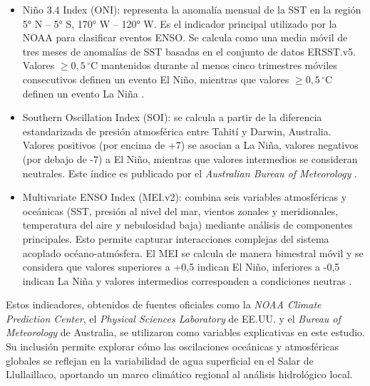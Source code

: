 \begin{itemize}
    \item Niño 3.4 Index (ONI): representa la anomalía mensual de la SST en la región 5° N – 5° S, 170° W – 120° W. Es el indicador principal utilizado por la NOAA para clasificar eventos ENSO. Se calcula como una media móvil de tres meses de anomalías de SST basadas en el conjunto de datos ERSST.v5. Valores $\geq 0{,}5\,^{\circ}\text{C}$ mantenidos durante al menos cinco trimestres móviles consecutivos definen un evento El Niño, mientras que valores $\geq 0{,}5\,^{\circ}\text{C}$ definen un evento La Niña \parencite{noaaONI}.
    
    \item Southern Oscillation Index (SOI): se calcula a partir de la diferencia estandarizada de presión atmosférica entre Tahití y Darwin, Australia. Valores positivos (por encima de +7) se asocian a La Niña, valores negativos (por debajo de -7) a El Niño, mientras que valores intermedios se consideran neutrales. Este índice es publicado por el \textit{Australian Bureau of Meteorology} \parencite{bom_soi_2024}.
    
    \item Multivariate ENSO Index (MEI.v2): combina seis variables atmosféricas y oceánicas (SST, presión al nivel del mar, vientos zonales y meridionales, temperatura del aire y nebulosidad baja) mediante análisis de componentes principales. Esto permite capturar interacciones complejas del sistema acoplado océano-atmósfera. El MEI se calcula de manera bimestral móvil y se considera que valores superiores a +0,5 indican El Niño, inferiores a -0,5 indican La Niña y valores intermedios corresponden a condiciones neutras \parencite{meiindex}.
\end{itemize}

Estos indicadores, obtenidos de fuentes oficiales como la \textit{NOAA Climate Prediction Center}, el \textit{Physical Sciences Laboratory} de EE.UU. y el \textit{Bureau of Meteorology} de Australia, se utilizaron como variables explicativas en este estudio. Su inclusión permite explorar cómo las oscilaciones oceánicas y atmosféricas globales se reflejan en la variabilidad de agua superficial en el Salar de Llullaillaco, aportando un marco climático regional al análisis hidrológico local.



